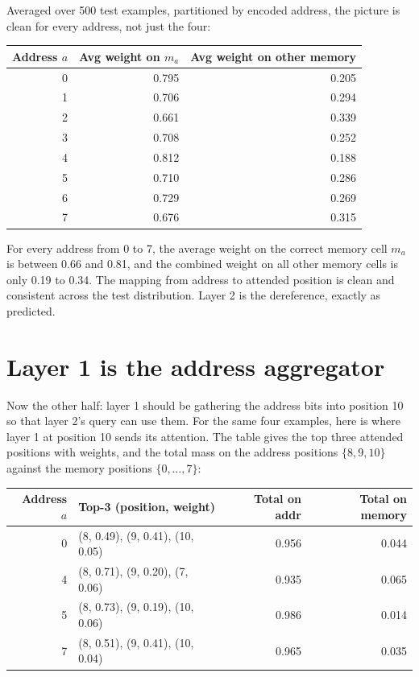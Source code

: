 Averaged over 500 test examples, partitioned by encoded address, the picture is
clean for every address, not just the four:

\begin{center}
\begin{tabular}{@{}rrr@{}}
\toprule
Address $a$ & Avg weight on $m_a$ & Avg weight on other memory \\
\midrule
0 & 0.795 & 0.205 \\
1 & 0.706 & 0.294 \\
2 & 0.661 & 0.339 \\
3 & 0.708 & 0.252 \\
4 & 0.812 & 0.188 \\
5 & 0.710 & 0.286 \\
6 & 0.729 & 0.269 \\
7 & 0.676 & 0.315 \\
\bottomrule
\end{tabular}
\end{center}

For every address from 0 to 7, the average weight on the correct memory cell
$m_a$ is between 0.66 and 0.81, and the combined weight on all other memory cells
is only 0.19 to 0.34. The mapping from address to attended position is clean and
consistent across the test distribution. Layer 2 is the dereference, exactly as
predicted.

\section{Layer 1 is the address aggregator}\label{sec:layer1-aggregator}

Now the other half: layer 1 should be gathering the address bits into position
10 so that layer 2's query can use them. For the same four examples, here is
where layer 1 at position 10 sends its attention. The table gives the top three
attended positions with weights, and the total mass on the address positions
$\{8, 9, 10\}$ against the memory positions $\{0, \ldots, 7\}$:

\begin{center}
\begin{tabular}{@{}rlrr@{}}
\toprule
Address $a$ & Top-3 (position, weight) & Total on addr & Total on memory \\
\midrule
0 & (8, 0.49), (9, 0.41), (10, 0.05) & 0.956 & 0.044 \\
4 & (8, 0.71), (9, 0.20), (7, 0.06) & 0.935 & 0.065 \\
5 & (8, 0.73), (9, 0.19), (10, 0.06) & 0.986 & 0.014 \\
7 & (8, 0.51), (9, 0.41), (10, 0.04) & 0.965 & 0.035 \\
\bottomrule
\end{tabular}
\end{center}

